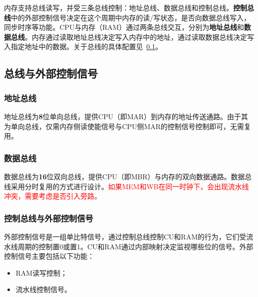 \documentclass[lang=cn,a4paper,newtx]{elegantpaper}
\begin{document}
内存支持总线读写，并受三条总线控制：地址总线、数据总线和控制总线。\textbf{控制总线}中的外部控制信号决定在这个周期中内存的读/写状态，是否向数据总线写入，同步时序等功能。CPU与内存（RAM）通过两条总线交互，分别为\textbf{地址总线}和\textbf{数据总线}。内存通过读取地址总线决定写入内存中的地址，通过读取数据总线决定写入指定地址中的数据。关于总线的具体配置见~\ref{sec:ExternalControl}。

\subsection{总线与外部控制信号}\label{sec:ExternalControl}

\subsubsection{地址总线}
地址总线为\textbf{8}位单向总线，提供CPU（即MAR）到内存的地址传送通路。由于其为单向总线，仅需内存侧读使能信号与CPU侧MAR的控制信号控制即可，无需复用。
\subsubsection{数据总线}
数据总线为\textbf{16}位双向总线，提供CPU（即MBR）与内存的双向数据通路。数据总线采用分时复用的方式进行设计。\textcolor{red}{如果MEM和WB在同一时钟下，会出现流水线冲突，需要考虑是否引入旁路。}
\subsubsection{控制总线与外部控制信号}
外部控制信号是一组单比特信号，通过控制总线控制CU和RAM的行为，它们受流水线周期的控制置0或置1。CU和RAM通过内部映射决定监视哪些位的信号。外部控制信号主要包括以下功能：
\begin{itemize}
  \item RAM读写控制；
  \item 流水线控制信号。
\end{itemize}
\end{document}
